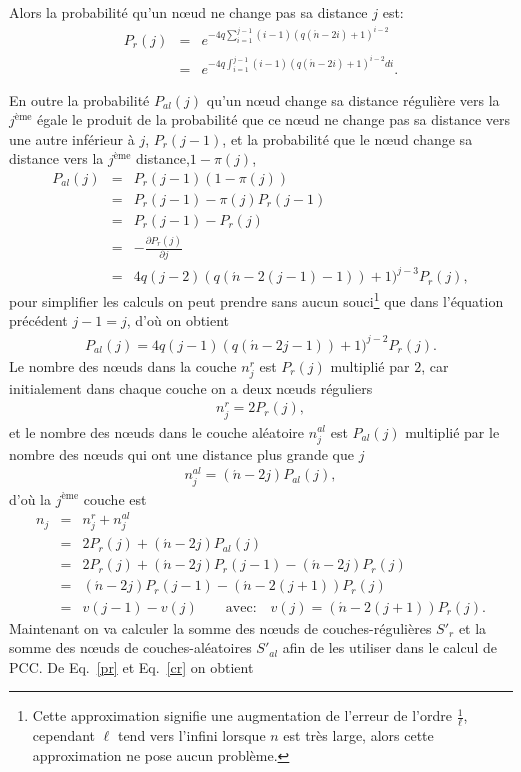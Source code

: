 Alors la probabilité qu'un nœud ne change pas sa distance $j$ est: 
\begin{eqnarray}
\label{pr}
P_r(j)&=& e^{-4q\sum_{i=1}^{j-1}(i-1)(q(\acute{n}-2i)+1)^{i-2}}\\\nonumber
&=&e^{-4q\int_{i=1}^{j-1}(i-1)(q(\acute{n}-2i)+1)^{i-2}di}.
\end{eqnarray}

En outre la probabilité $P_{al}(j)$ qu'un nœud change sa distance régulière vers la  $j^{\text{ème}}$ égale le produit de la probabilité que ce nœud ne change pas sa distance vers une autre inférieur à  $j$, $P_r(j-1)$, et la probabilité que le nœud change sa distance vers la $j^{\text{ème}}$ distance,$1-\pi(j)$,
\begin{eqnarray}\nonumber
P_{al}(j)&=&P_r(j-1)(1-\pi(j))\\\nonumber
&=&P_r(j-1)-\pi(j)P_r(j-1)\\\nonumber
&=&P_r(j-1)-P_r(j)\\\nonumber
&=&-\frac{\partial P_r(j)}{\partial j}\\
&=&4q(j-2)(q(\acute{n}-2(j-1)-1))+1)^{j-3}P_r(j),
\end{eqnarray}
pour simplifier les calculs on peut prendre sans aucun souci\footnote{Cette approximation signifie une augmentation de l'erreur de l'ordre $\frac{1}{\ell}$, cependant $\ell$ tend vers l'infini lorsque $n$ est très large, alors cette approximation ne pose aucun problème.} que dans l'équation précédent $j-1=j$, d'où on obtient
\begin{eqnarray}
P_{al}(j)=4q(j-1)(q(\acute{n}-2j-1))+1)^{j-2}P_r(j).
\label{pal}
\end{eqnarray}
Le nombre des nœuds dans la couche $n_{j}^r$ est $P_r(j)$ multiplié par $2$, car initialement dans chaque couche on a  deux nœuds réguliers
\begin{eqnarray}
n_{j}^r=2P_r(j),
\label{cr}
\end{eqnarray}
et le nombre des nœuds dans le couche aléatoire $n_{j}^{al}$ est $P_{al}(j)$ multiplié par le nombre des nœuds qui ont une distance plus grande que $j$
\begin{eqnarray}
n_{j}^{al}=(\acute{n}-2j)P_{al}(j),
\label{cal}
\end{eqnarray}
d'où la $j^{\text{ème}}$ couche est
\begin{eqnarray}
n_j&=&n_{j}^{r}+n_{j}^{al}\\\nonumber
&=&2P_r(j)+(\acute{n}-2j)P_{al}(j)\\\nonumber
&=&2P_r(j)+(\acute{n}-2j)P_r(j-1)-(\acute{n}-2j)P_r(j)\\\nonumber
&=&(\acute{n}-2j)P_r(j-1)-(\acute{n}-2(j+1))P_r(j)\\\nonumber
&=&v(j-1)-v(j) \quad \quad  \text{avec:} \quad v(j)=(\acute{n}-2(j+1))P_r(j).
\nonumber
\label{c}
\end{eqnarray}
Maintenant on va calculer la somme des nœuds de couches-régulières $S'_r$ et la somme des nœuds de couches-aléatoires $S'_{al}$ afin de les utiliser dans le calcul de PCC. De Eq.~\eqref{pr} et Eq.~\eqref{cr} on obtient


